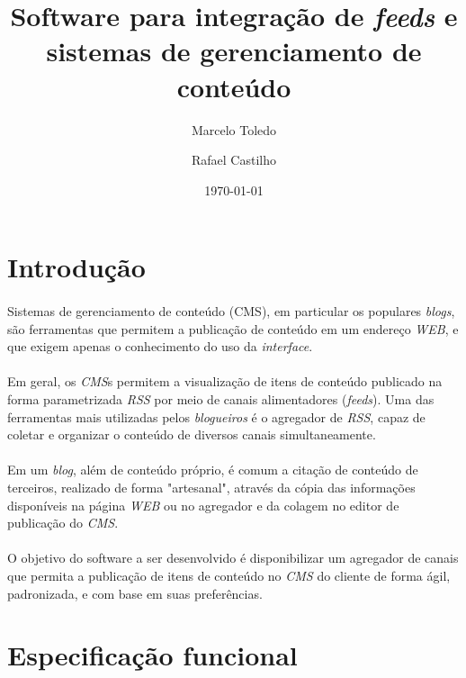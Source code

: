 \documentclass[a4paper,12pt]{article}
\def\blog{\emph{CMS}}
\def\feeds{\emph{RSS}}
\begin{document}
\title{Software para integração de \emph{feeds} e sistemas de gerenciamento de conteúdo}
\author{Marcelo Toledo \and Rafael Castilho}
\date{\today}

\maketitle

\newpage
\section{Introdução}

\paragraph{}
Sistemas de gerenciamento de conteúdo (CMS), em particular os populares
\emph{blogs}, são ferramentas que permitem a publicação de conteúdo em um
endereço \emph{WEB}, e que exigem apenas o conhecimento do uso da
\emph{interface}.

\paragraph{}
Em geral, os \blog{}s permitem a visualização de itens de conteúdo publicado na
forma parametrizada \feeds{} por meio de canais alimentadores (\emph{feeds}). Uma
das ferramentas mais utilizadas pelos \emph{blogueiros} é o agregador de
\feeds{}, capaz de coletar e organizar o conteúdo de diversos canais
simultaneamente.

\paragraph{}
Em um \emph{blog}, além de conteúdo próprio, é comum a citação de conteúdo de
terceiros, realizado de forma "artesanal", através da cópia das informações
disponíveis na página \emph{WEB} ou no agregador e da colagem no editor de
publicação do \blog{}.

\paragraph{}
O objetivo do software a ser desenvolvido é disponibilizar um agregador de
canais que permita a publicação de itens de conteúdo no \blog{} do cliente de
forma ágil, padronizada, e com base em suas preferências.

\section{Especificação funcional}
\end{document}
